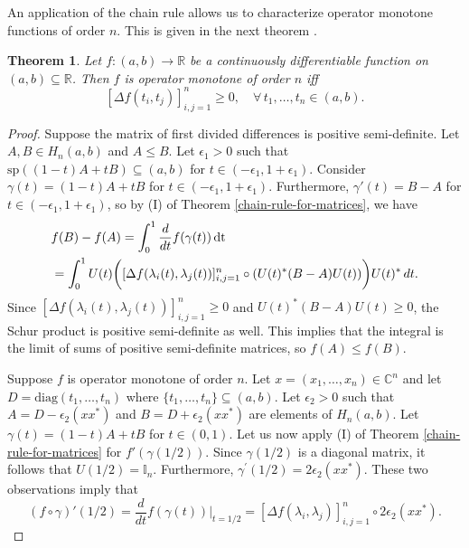 \documentclass[12pt,a4paper]{amsart}
\newtheorem{theorem}{Theorem}
\theoremstyle{definition}
\begin{document}
	An application of the chain rule allows us to characterize operator monotone functions of order $n$. This is given in the next theorem \cite[Thoerem 6.6.36]{horn-book}.
	\begin{theorem}\label{first-divided-difference-positive-implies-matrix-monotone}
		Let $f:(a,b) \rightarrow \mathbb{R}$ be a continuously differentiable function on $(a, b ) \subseteq \mathbb{R}$. Then $f$ is operator monotone of order $n$ iff 
		\[  [\Delta f(t_i, t_j)]_{i,j=1}^{n} \geq 0, \quad \forall \, t_1, \ldots,  t_n \in (a, b).\]
	\end{theorem}
	\begin{proof}
		Suppose the matrix of first divided differences is positive semi-definite. Let $A, B \in H_n(a, b)$ and $A \leq B$. Let $\epsilon_1 > 0$ such that $\text{sp}((1-t)A + tB) \subseteq (a, b)$ for $t \in (-\epsilon_1, 1 + \epsilon_1)$. Consider $\gamma(t) = (1-t)A + tB$ for $t \in (-\epsilon_1, 1 + \epsilon_1)$. Furthermore, $\gamma'(t) = B-A$ for $t \in (-\epsilon_1, 1 + \epsilon_1)$, so by (I) of Theorem \ref{chain-rule-for-matrices}, we have 
		\begin{align*}
			\begin{split}
				&f(B)-f(A) = \int_{0}^{1} \frac{d}{dt} f(\gamma(t)) \, \rm{d}t \\
				&= \int_{0}^{1} U(t) \bigg( [\Delta f(\lambda_i(t), \lambda_j(t))]_{i,j=1}^{n} \circ (U(t)^{*} (B-A) U(t)) \bigg)U(t)^{*} \, dt.
			\end{split}
		\end{align*}
		Since  $[\Delta f(\lambda_i(t), \lambda_j(t))]_{i,j=1}^{n}  \geq 0$ and $U(t)^{*} (B-A) U(t) \geq 0$, the Schur product is positive semi-definite as well. This implies that the integral is the limit of sums of positive semi-definite matrices, so $f(A) \leq f(B)$.
		\par 
		Suppose $f$ is operator monotone of order $n$. Let $x = (x_1, \ldots, x_n) \in \mathbb{C}^{n}$ and let $D = \text{diag}(t_1, \ldots, t_n)$ where $\lbrace t_1, \ldots, t_n \rbrace \subseteq (a, b)$. Let $\epsilon_2 > 0$ such that $A = D - \epsilon_2 (xx^{*})$ and  $B  = D + \epsilon_2 (xx^{*})$ are elements of $H_n(a,b)$. Let $\gamma(t) = (1-t) A + tB$ for $t \in (0,1)$. Let us now apply (I) of Theorem \ref{chain-rule-for-matrices} for $f'(\gamma(1/2))$.  Since  $\gamma(1/2)$ is a diagonal matrix, it follows that $U(1/2) = \mathbb{I}_n$. Furthermore,  $\gamma^{'}(1/2)= 2 \epsilon_2 (x x^{*})$. These two observations imply that
		\begin{equation*}\label{horn-th-6.6.36-eq1}
			(f \circ \gamma)'(1/2)  = \frac{d}{dt} f(\gamma(t)) \vert_{t=1/2} = [\Delta f(\lambda_i, \lambda_j)]_{i,j=1}^{n} \circ 2 \epsilon_2(x x^{*}).
		\end{equation*}
		

\end{proof}
\end{document}
